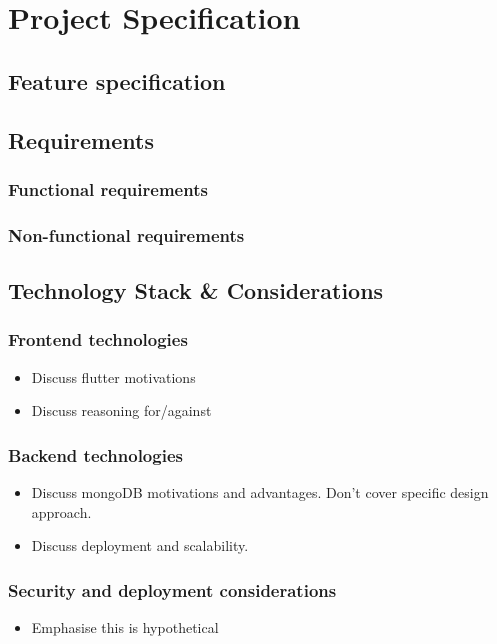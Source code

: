 \chapter{Project Specification}
\label{chap:project-specification}

\section{Feature specification}

\section{Requirements}
\subsection{Functional requirements}
\subsection{Non-functional requirements}

\section{Technology Stack \& Considerations}
\subsection{Frontend technologies}
\begin{itemize}[noitemsep]
    \item Discuss flutter motivations
    \item Discuss reasoning for/against
\end{itemize}
\subsection{Backend technologies}
\begin{itemize}[noitemsep]
    \item Discuss mongoDB motivations and advantages. Don't cover
    specific design approach.
    \item Discuss deployment and scalability.
\end{itemize}
\subsection{Security and deployment considerations}
\begin{itemize}[noitemsep]
    \item Emphasise this is hypothetical
\end{itemize}

